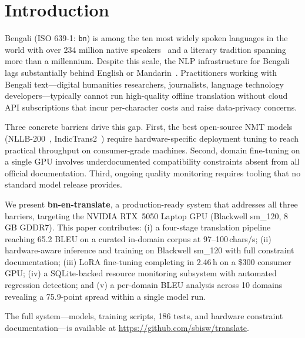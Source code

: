 \documentclass[sigconf]{acmart}
\newcommand{\TRAINDURATION}{2.46\,h}
\begin{document}
\maketitle

\section{Introduction}

Bengali (ISO 639-1: \texttt{bn}) is among the ten most widely spoken languages
in the world with over 234 million native speakers~\cite{ethnologue2023} and a
literary tradition spanning more than a millennium.
Despite this scale, the NLP infrastructure for Bengali lags substantially behind
English or Mandarin~\cite{hasan2020xl}.
Practitioners working with Bengali text---digital humanities researchers,
journalists, language technology developers---typically cannot run high-quality
offline translation without cloud API subscriptions that incur per-character costs
and raise data-privacy concerns.

Three concrete barriers drive this gap.
First, the best open-source NMT models (NLLB-200~\cite{nllb2022},
IndicTrans2~\cite{gala2023indictrans2}) require hardware-specific deployment
tuning to reach practical throughput on consumer-grade machines.
Second, domain fine-tuning on a single GPU involves underdocumented compatibility
constraints absent from all official documentation.
Third, ongoing quality monitoring requires tooling that no standard model release
provides.

We present \textbf{bn-en-translate}, a production-ready system that addresses all
three barriers, targeting the NVIDIA RTX~5050 Laptop GPU (Blackwell sm\_120,
8\,GB GDDR7).
This paper contributes: (i) a four-stage translation pipeline reaching 65.2 BLEU
on a curated in-domain corpus at 97--100\,chars/s; (ii) hardware-aware
inference and training on Blackwell sm\_120 with full constraint documentation;
(iii) LoRA fine-tuning completing in \TRAINDURATION{} on a \$300 consumer GPU;
(iv) a SQLite-backed resource monitoring subsystem with automated regression
detection; and (v) a per-domain BLEU analysis across 10 domains revealing a
75.9-point spread within a single model run.

The full system---models, training scripts, 186 tests, and hardware constraint
documentation---is available at \url{https://github.com/sbisw/translate}.

\end{document}
